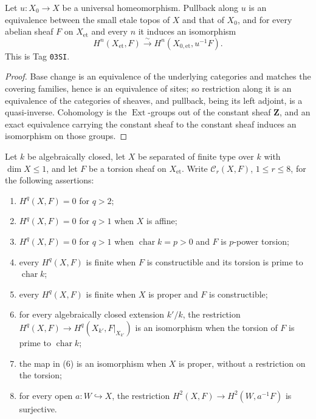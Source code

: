 \begin{proposition}
\label{prop:weil-pbc-universal-homeomorphism-topos}
\uses{}
\leanok

Let $u:X_0\to X$ be a universal homeomorphism.  Pullback along $u$ is an
equivalence between the small etale topos of $X$ and that of $X_0$, and for
every abelian sheaf $F$ on $X_{\mathrm{et}}$ and every $n$ it induces an
isomorphism
\[
 H^n(X_{\mathrm{et}},F)\xrightarrow{\sim}H^n(X_{0,\mathrm{et}},u^{-1}F).
\]
This is Tag \texttt{03SI}.
\end{proposition}
\begin{proof}
\leanok

Base change is an equivalence of the underlying categories and matches the
covering families, hence is an equivalence of sites; so restriction along it
is an equivalence of the categories of sheaves, and pullback, being its left
adjoint, is a quasi-inverse.  Cohomology is the $\operatorname{Ext}$-groups
out of the constant sheaf $\mathbf Z$, and an exact equivalence carrying the
constant sheaf to the constant sheaf induces an isomorphism on those groups.
\end{proof}

\begin{definition}
\label{def:weil-pbc-eight-curve-assertions}
\uses{}
Let $k$ be algebraically closed, let $X$ be separated of finite type over
$k$ with $\dim X\leq1$, and let $F$ be a torsion sheaf on $X_{\mathrm{et}}$.
Write $\mathcal C_r(X,F)$, $1\leq r\leq8$, for the following assertions:
\begin{enumerate}[label=(\arabic*)]
\item $H^q(X,F)=0$ for $q>2$;
\item $H^q(X,F)=0$ for $q>1$ when $X$ is affine;
\item $H^q(X,F)=0$ for $q>1$ when $\operatorname{char}k=p>0$ and $F$ is
  $p$-power torsion;
\item every $H^q(X,F)$ is finite when $F$ is constructible and its torsion
  is prime to $\operatorname{char}k$;
\item every $H^q(X,F)$ is finite when $X$ is proper and $F$ is
  constructible;
\item for every algebraically closed extension $k'/k$, the restriction
  $H^q(X,F)\to H^q(X_{k'},F|_{X_{k'}})$ is an isomorphism when the torsion
  of $F$ is prime to $\operatorname{char}k$;
\item the map in (6) is an isomorphism when $X$ is proper, without a
  restriction on the torsion;
\item for every open $a:W\hookrightarrow X$, the restriction
  $H^2(X,F)\to H^2(W,a^{-1}F)$ is surjective.
\end{enumerate}
\end{definition}

